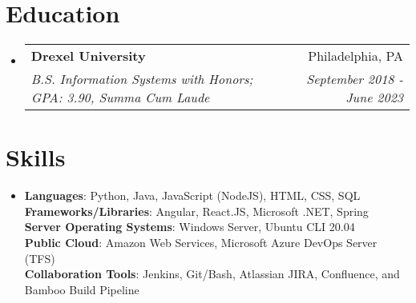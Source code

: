 \documentclass[letterpaper,11pt]{article}
\makeatletter
\newcommand{\resumeItemSmall}[2]{
        \item[]
        \small{
            \textbf{#1}{: #2 \vspace{-2pt}}
        }
    }
\newcommand{\resumeSubheading}[4]{
    \vspace{-1pt}\item[]
        \begin{tabular*}{0.97\textwidth}{l@{\extracolsep{\fill}}r}
        \textbf{#1} & #2 \\
        \textit{\small#3} & \textit{\small #4} \\
        \end{tabular*}\vspace{-5pt}
    }
\newcommand{\resumeSubItemSmall}[2]{\resumeItemSmall{#1}{#2}\vspace{-4pt}}
\newcommand{\resumeSubHeadingListStart}{\begin{itemize}[leftmargin=*]}
\newcommand{\resumeSubHeadingListEnd}{\end{itemize}}
\makeatother
\begin{document}
    \section{Education}
    \resumeSubHeadingListStart
        \resumeSubheading
        {Drexel University}{Philadelphia, PA}
        {B.S. Information Systems with Honors; GPA: 3.90, Summa Cum Laude}{September 2018 - June 2023}
    \resumeSubHeadingListEnd

        \section{Skills}
            \resumeSubHeadingListStart
            \item[]{
                \textbf{Languages}{: Python, Java, JavaScript (NodeJS), HTML, CSS, SQL}
                \hfill \\
                \textbf{Frameworks/Libraries}{: Angular, React.JS, Microsoft .NET, Spring} \\
                \textbf{Server Operating Systems}{: Windows Server, Ubuntu CLI 20.04} \\
                \textbf{Public Cloud}{: Amazon Web Services, Microsoft Azure DevOps Server (TFS)} \\
                \textbf{Collaboration Tools}{: Jenkins, Git/Bash, Atlassian JIRA, Confluence, and Bamboo Build Pipeline} \\
            }
            \resumeSubHeadingListEnd
    
\end{document}
